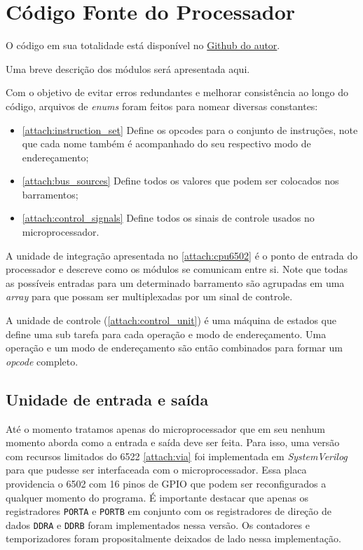 \documentclass[
	12pt,				  %
	openright,		%
	a4paper,			%
	english,			%
	french,				%
	spanish,			%
	brazil,				%
]{abntex2}
\newcommand{\code}[1]{\colorbox{light-gray}{\texttt{#1}}}
\begin{document}
\section{Código Fonte do Processador}

O código em sua totalidade está disponível no
\href{https://github.com/WilsonCazarre/6502}{Github do autor}.

Uma breve descrição dos módulos será apresentada aqui.

Com o objetivo de evitar erros redundantes e melhorar consistência ao longo do código,
arquivos de \emph{enums} foram feitos para nomear diversas constantes:
\begin{itemize}
	\item \autoref{attach:instruction_set} Define os opcodes para o conjunto de instruções,
	      note que cada nome também é acompanhado do seu respectivo modo de endereçamento;
	\item \autoref{attach:bus_sources} Define todos os valores que podem ser colocados nos barramentos;
	\item \autoref{attach:control_signals} Define todos os sinais de controle usados no microprocessador.
\end{itemize}

A unidade de integração apresentada no \autoref{attach:cpu6502} é o ponto de entrada do processador
e descreve como os módulos se comunicam entre si. Note que todas as possíveis entradas para um determinado
barramento são agrupadas em uma \emph{array} para que possam ser multiplexadas por um sinal de controle.

A unidade de controle (\autoref{attach:control_unit}) é uma máquina de estados que define uma sub tarefa para cada
operação e modo de endereçamento. Uma operação e um modo de endereçamento são então combinados para formar um \emph{opcode}
completo.

\subsection{Unidade de entrada e saída}
Até o momento tratamos apenas do microprocessador que em seu nenhum momento aborda como
a entrada e saída deve ser feita. Para isso, uma versão com recursos limitados do 6522 \autoref{attach:via} foi
implementada em \emph{SystemVerilog} para que pudesse ser interfaceada com o microprocessador.
Essa placa providencia o 6502 com 16 pinos de GPIO que podem ser reconfigurados a qualquer momento do programa.
É importante destacar que apenas os registradores \code{PORTA} e \code{PORTB} em conjunto com os registradores de direção de dados \code{DDRA} e \code{DDRB}
foram implementados nessa versão. Os contadores e temporizadores foram propositalmente deixados de lado nessa implementação.
\end{document}
